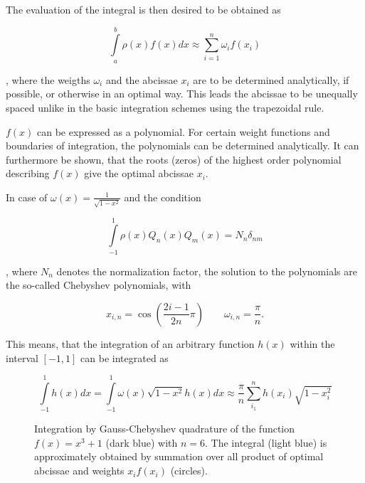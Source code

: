The evaluation of the integral is then desired to be obtained as

\begin{equation}
  \int\limits_a^b \rho(x) f(x) dx \approx \sum\limits_{i=1}^n \omega_i f(x_i)
\end{equation}

, where the weigths $\omega_i$ and the abcissae $x_i$ are to be determined
analytically, if possible, or otherwise in an optimal way. This leads the abcissae
to be unequally spaced unlike in the basic
integration schemes using the trapezoidal rule.

$f(x)$ can be expressed as a polynomial. For certain weight functions and boundaries
of integration, the
polynomials can be determined analytically.
It can furthermore be shown, that the roots (zeros) of the highest order polynomial
describing $f(x)$ give the optimal abcissae $x_i$.

In case of
$\omega(x)= \frac{1}{\sqrt{1-x^2}}$ and the condition

\begin{equation}
  \int\limits_{-1}^{1} \rho(x) Q_n(x) Q_m(x) = N_n \delta_{nm}
\end{equation}

, where $N_n$ denotes the normalization factor,
the solution to the polynomials are the so-called Chebyshev polynomials, with

\begin{equation}
  x_{i,n} = \cos \left( \frac{2i-1}{2n} \pi \right)
  \quad\quad \omega_{i,n} = \frac \pi n .
\end{equation}

This means, that the integration of an arbitrary function $h(x)$ within
the interval $[-1,1]$ can be integrated as

\begin{equation}
  \int\limits_{-1}^1 h(x) dx = \int\limits_{-1}^1 \omega(x) \sqrt{1-x^2} h(x) dx
  \approx \frac \pi n \sum\limits_{i_1}^n h(x_i) \sqrt{1-x_i^2}
\end{equation}

\begin{figure}[h]
  \centering
  
  \caption{Integration by Gauss-Chebyshev quadrature of the function
           $f(x)=x^3 + 1$ (dark blue) with $n=6$. The integral (light blue)
           is approximately obtained by summation
           over all product of optimal abcissae and weights $x_if(x_i)$ (circles).}
  \label{figure:gaussian_quadrature}
\end{figure}

